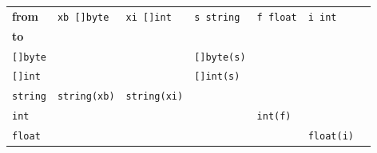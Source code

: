 \begin{tabular}{lllllll}
\textbf{from}	 &  \verb|xb []byte|	    & \verb|xi []int| & \verb|s string|     &	\verb|f float|  &  \verb|i int|	\\ \cmidrule(r){1-6}
\textbf{to}	 &				    &		    &			    &			& \\ \cmidrule(r){1-1}
\verb|[]byte|    &				    &		    & \verb|[]byte(s)|	    &			& \\
\verb|[]int|     &				    &		    & \verb|[]int(s)|	    &			& \\
\verb|string|    &		  \verb|string(xb)| &\verb|string(xi)|	    &		    &			& \\
\verb|int|	 &				    &		    &			    & \verb|int(f)|	& \\
\verb|float|	 &				    &		    &			    &			& \verb|float(i)| \\
\end{tabular}
